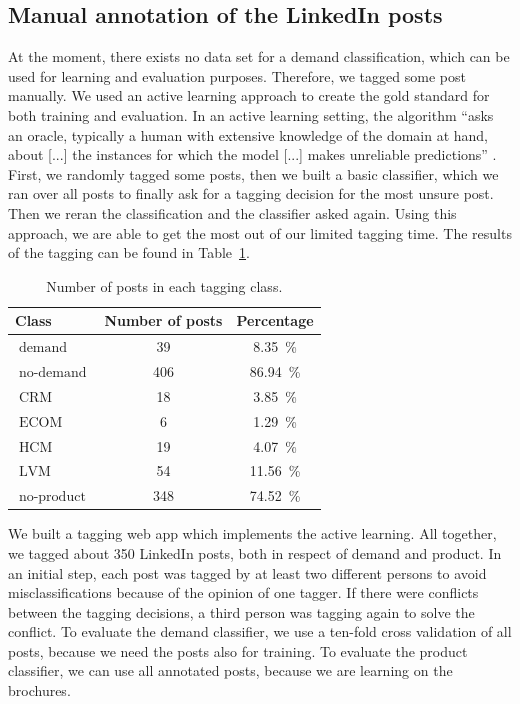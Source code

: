 \subsection{Manual annotation of the LinkedIn posts}

At the moment, there exists no data set for a demand classification, which can be used for learning and evaluation purposes.
Therefore, we tagged some post manually.
We used an active learning approach to create the gold standard for both training and evaluation.
In an active learning setting, the algorithm ``asks an oracle, typically a human with extensive knowledge of the domain at hand, about [...] the instances for which the model [...] makes unreliable predictions'' \cite{olsson2009literature}.
First, we randomly tagged some posts, then we built a basic classifier, which we ran over all posts to finally ask for a tagging decision for the most unsure post.
Then we reran the classification and the classifier asked again.
Using this approach, we are able to get the most out of our limited tagging time.
The results of the tagging can be found in Table~\ref{table:data_overview}.

\begin{table}[h]
	\centering
	\begin{tabular}{lcc}
		\hline
		\textbf{Class} & \textbf{Number of posts} & \textbf{Percentage} \\
		\hline
		\hline
		$\operatorname{demand}$ & 39 & 8.35~\% \\
		\hline
		$\operatorname{no-demand}$ & 406 & 86.94~\% \\
		\hline
		\hline
		$\operatorname{CRM}$ & 18 & 3.85~\% \\
		\hline
		$\operatorname{ECOM}$ & 6 & 1.29~\% \\
		\hline
		$\operatorname{HCM}$ & 19 & 4.07~\% \\
		\hline
		$\operatorname{LVM}$ & 54 & 11.56~\% \\
		\hline
		$\operatorname{no-product}$ & 348 & 74.52~\% \\
		\hline
	\end{tabular}
	\caption{Number of posts in each tagging class.}
	\label{table:data_overview}
\end{table}

We built a tagging web app which implements the active learning.
All together, we tagged about 350 LinkedIn posts, both in respect of demand and product.
In an initial step, each post was tagged by at least two different persons to avoid misclassifications because of the opinion of one tagger.
If there were conflicts between the tagging decisions, a third person was tagging again to solve the conflict.
To evaluate the demand classifier, we use a ten-fold cross validation of all posts, because we need the posts also for training.
To evaluate the product classifier, we can use all annotated posts, because we are learning on the brochures.

